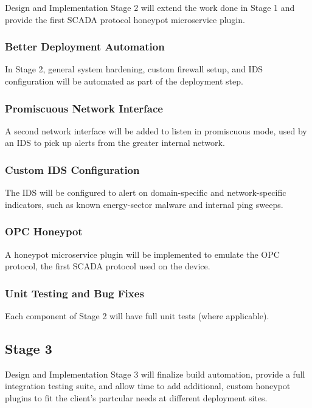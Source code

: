 Design and Implementation Stage 2 will extend the work done in Stage 1
and provide the first SCADA protocol honeypot microservice plugin.

\subsubsection{Better Deployment Automation}

In Stage 2, general system hardening, custom firewall setup, and IDS
configuration will be automated as part of the deployment step.

\subsubsection{Promiscuous Network Interface}

A second network interface will be added to listen in promiscuous mode, used
by an IDS to pick up alerts from the greater internal network.

\subsubsection{Custom IDS Configuration}

The IDS will be configured to alert on domain-specific and network-specific
indicators, such as known energy-sector malware and internal ping sweeps.

\subsubsection{OPC Honeypot}

A honeypot microservice plugin will be implemented to emulate the OPC protocol,
the first SCADA protocol used on the device.

\subsubsection{Unit Testing and Bug Fixes}

Each component of Stage 2 will have full unit tests (where applicable).


\subsection{Stage 3}

Design and Implementation Stage 3 will finalize build automation, provide a
full integration testing suite, and allow time to add additional, custom
honeypot plugins to fit the client's partcular needs at different deployment
sites.

